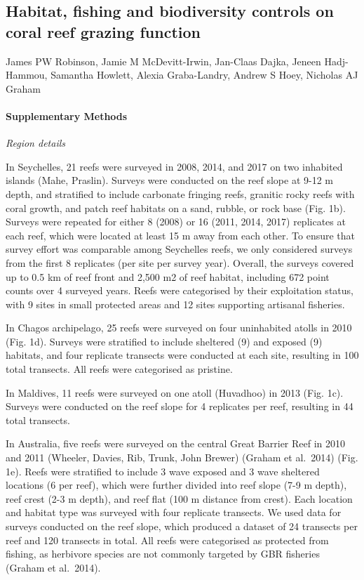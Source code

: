 \documentclass[12pt,]{article}
\title{}
\author{}
\date{}
\let\oldparagraph\paragraph
\renewcommand{\paragraph}[1]{\oldparagraph{#1}\mbox{}}
\begin{document}
\hypertarget{habitat-fishing-and-biodiversity-controls-on-coral-reef-grazing-function}{%
\subsection{Habitat, fishing and biodiversity controls on coral reef
grazing
function}\label{habitat-fishing-and-biodiversity-controls-on-coral-reef-grazing-function}}

James PW Robinson, Jamie M McDevitt-Irwin, Jan-Claas Dajka, Jeneen
Hadj-Hammou, Samantha Howlett, Alexia Graba-Landry, Andrew S Hoey,
Nicholas AJ Graham

\hypertarget{supplementary-methods}{%
\paragraph{Supplementary Methods}\label{supplementary-methods}}

\emph{Region details}

In Seychelles, 21 reefs were surveyed in 2008, 2014, and 2017 on two
inhabited islands (Mahe, Praslin). Surveys were conducted on the reef
slope at 9-12 m depth, and stratified to include carbonate fringing
reefs, granitic rocky reefs with coral growth, and patch reef habitats
on a sand, rubble, or rock base (Fig. 1b). Surveys were repeated for
either 8 (2008) or 16 (2011, 2014, 2017) replicates at each reef, which
were located at least 15 m away from each other. To ensure that survey
effort was comparable among Seychelles reefs, we only considered surveys
from the first 8 replicates (per site per survey year). Overall, the
surveys covered up to 0.5 km of reef front and 2,500 m2 of reef habitat,
including 672 point counts over 4 surveyed years. Reefs were categorised
by their exploitation status, with 9 sites in small protected areas and
12 sites supporting artisanal fisheries.

In Chagos archipelago, 25 reefs were surveyed on four uninhabited atolls
in 2010 (Fig. 1d). Surveys were stratified to include sheltered (9) and
exposed (9) habitats, and four replicate transects were conducted at
each site, resulting in 100 total transects. All reefs were categorised
as pristine.

In Maldives, 11 reefs were surveyed on one atoll (Huvadhoo) in 2013
(Fig. 1c). Surveys were conducted on the reef slope for 4 replicates per
reef, resulting in 44 total transects.

In Australia, five reefs were surveyed on the central Great Barrier Reef
in 2010 and 2011 (Wheeler, Davies, Rib, Trunk, John Brewer) (Graham et
al.~2014) (Fig. 1e). Reefs were stratified to include 3 wave exposed and
3 wave sheltered locations (6 per reef), which were further divided into
reef slope (7-9 m depth), reef crest (2-3 m depth), and reef flat (100 m
distance from crest). Each location and habitat type was surveyed with
four replicate transects. We used data for surveys conducted on the reef
slope, which produced a dataset of 24 transects per reef and 120
transects in total. All reefs were categorised as protected from
fishing, as herbivore species are not commonly targeted by GBR fisheries
(Graham et al.~2014).
\end{document}
